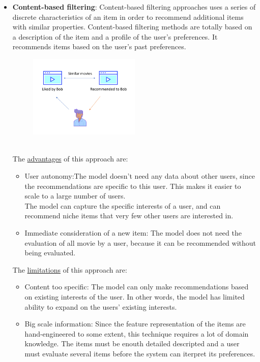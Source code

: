 \documentclass{article}
\begin{document}
\begin{itemize}
      \item \textbf{Content-based filtering}: Content-based filtering approaches uses a series of discrete characteristics of an item in order to recommend additional items with similar properties. Content-based filtering methods are totally based on a description of the item and a profile of the user’s preferences. It recommends items based on the user’s past preferences.\\
      \begin{figure}[ht]
            \begin{center}
                  \includegraphics[width=0.5\textwidth]{images/Content-based filtering.png}
            \end{center}
      \end{figure}\\
      The \underline{advantages} of this approach are:
      \begin{itemize}
            \item User autonomy:The model doesn't need any data about other users, since the recommendations are specific to this user. This makes it easier to scale to a large number of users.\\The model can capture the specific interests of a user, and can recommend niche items that very few other users are interested in.
            \item Immediate consideration of a new item: The model does not need the evaluation of all movie by a user, because it can be recommended without being evaluated.
      \end{itemize}
      The \underline{limitations} of this approach are:
      \begin{itemize}
            \item Content too specific: The model can only make recommendations based on existing interests of the user. In other words, the model has limited ability to expand on the users' existing interests.
            \item Big scale information: Since the feature representation of the items are hand-engineered to some extent, this technique requires a lot of domain knowledge. The items must be enouth detailed descripted and a user must evaluate several items before the system can iterpret its preferences.
      \end{itemize}
\end{itemize}
\end{document}
